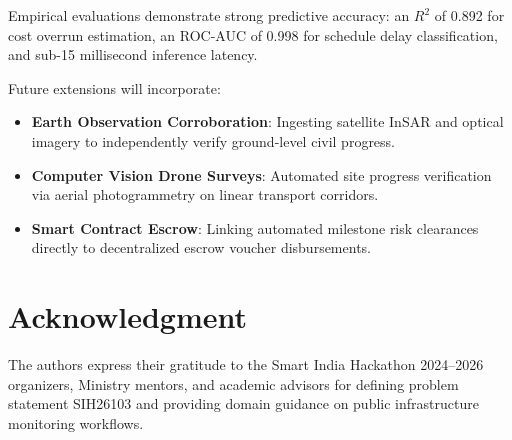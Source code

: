 \documentclass[conference]{IEEEtran}
\begin{document}
Empirical evaluations demonstrate strong predictive accuracy: an $R^2$ of 0.892 for cost overrun estimation, an ROC-AUC of 0.998 for schedule delay classification, and sub-15 millisecond inference latency. 

Future extensions will incorporate:
\begin{itemize}
    \item \textbf{Earth Observation Corroboration}: Ingesting satellite InSAR and optical imagery to independently verify ground-level civil progress.
    \item \textbf{Computer Vision Drone Surveys}: Automated site progress verification via aerial photogrammetry on linear transport corridors.
    \item \textbf{Smart Contract Escrow}: Linking automated milestone risk clearances directly to decentralized escrow voucher disbursements.
\end{itemize}

\section*{Acknowledgment}
The authors express their gratitude to the Smart India Hackathon 2024--2026 organizers, Ministry mentors, and academic advisors for defining problem statement SIH26103 and providing domain guidance on public infrastructure monitoring workflows.
\end{document}
